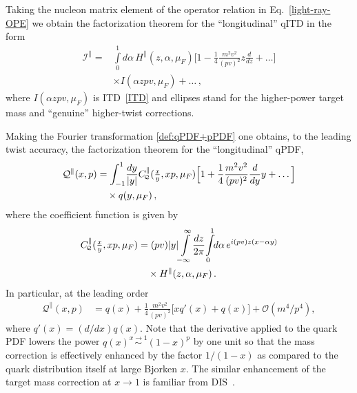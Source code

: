 \documentclass[aps,prd,twocolumn,a4paper,superscriptaddress,10pt,showpacs,notitlepage,floatfix]{revtex4-1}
\newcommand{\Qd}{\!\scriptscriptstyle \mathcal{Q}}
\begin{document}
Taking the nucleon matrix element of the operator relation in Eq.~\eqref{light-ray-OPE} we obtain the 
factorization theorem for the ``longitudinal'' qITD in the form
\begin{align}
\mathcal{I}^\parallel   = &
 \int\limits_0^1 d\alpha \, H^\parallel(z,\alpha,\mu_F)
  \Big[1 - \frac{1}{4} \frac{m^2 v^2}{(pv)^2} z\frac{d}{dz} +\ldots \Big]\\ & \nonumber
\times I(\alpha z pv , \mu_F)
+\ldots\,,
\end{align}
where $I(\alpha z pv,\mu_F)$ is  ITD~\eqref{ITD} and ellipses stand for the higher-power target mass 
and ``genuine'' higher-twist corrections.

Making the Fourier transformation \eqref{def:qPDF+pPDF} one obtains, to the leading twist accuracy,
the factorization theorem for the ``longitudinal'' qPDF,
\begin{align}
\label{qPDF2}
 \mathcal{Q}^\parallel(x,p) &= \int_{-1}^1 \!\frac{dy}{|y|} C^\parallel_{\Qd}(\tfrac{x}{y},xp,\mu_F)
\Big[1 + \frac{1}{4} \frac{m^2 v^2}{(pv)^2} \frac{d}{dy} y +\ldots \Big] 
\notag\\&\quad 
\times  q(y,\mu_F)\,, 
\end{align}
where the coefficient function is given by 
\begin{align}
  C^\parallel_{\Qd}(\tfrac{x}{y},xp,\mu_F) &= (pv)|y|\!\int\limits_{-\infty}^{\infty}\!\frac{dz}{2\pi}\! \int\limits_0^1\!\! d\alpha\,
e^{i(pv)z(x-\alpha y)}
\notag\\&\quad \times H^\parallel(z,\alpha,\mu_F)\,. 
\end{align} 
In particular, at the leading order
\begin{align}
\label{target-parallel}
 \mathcal{Q}^\parallel(x,p) &= q(x) + \frac{1}{4} \frac{m^2 v^2}{(pv)^2} \big[x q'(x)  + q(x)\big]
+ \mathcal{O}\left({m^4}/{p^4}\right),
\end{align}
where $q'(x) = (d/dx) q(x)$. Note that the derivative applied to the quark PDF lowers the power $q(x) \stackrel{x \to 1}{\sim} (1-x)^p$ by one unit so that the mass correction is effectively enhanced by the factor $1/(1-x)$ as compared to the quark distribution itself at large Bjorken $x$. The similar enhancement of the target mass correction at $x\to 1$ is familiar from DIS~\cite{Nachtmann:1973mr}.
\end{document}
